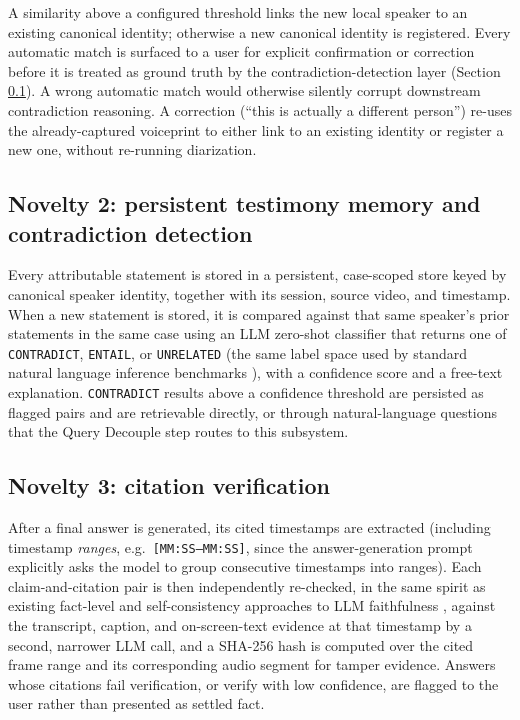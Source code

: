 \documentclass[3p,times,procedia]{elsarticle}
\begin{document}
A similarity above a configured threshold links the new local speaker to an existing
canonical identity; otherwise a new canonical identity is registered. Every
automatic match is surfaced to a user for explicit confirmation or correction before it
is treated as ground truth by the contradiction-detection layer (Section
\ref{sec:novelty2}). A wrong automatic match would otherwise silently corrupt
downstream contradiction reasoning. A correction (``this is actually a different
person'') re-uses the already-captured voiceprint to either link to an existing
identity or register a new one, without re-running diarization.

\subsection{Novelty 2: persistent testimony memory and contradiction detection}
\label{sec:novelty2}

Every attributable statement is stored in a persistent, case-scoped store keyed by
canonical speaker identity, together with its session, source video, and timestamp.
When a new statement is stored, it is compared against that same speaker's prior
statements in the same case using an LLM zero-shot classifier that returns one of
\texttt{CONTRADICT}, \texttt{ENTAIL}, or \texttt{UNRELATED} (the same label space used
by standard natural language inference benchmarks \cite{williams2018multinli,
nie2020anli}), with a confidence score and a free-text explanation. \texttt{CONTRADICT} results above a confidence threshold are
persisted as flagged pairs and are retrievable directly, or through natural-language
questions that the Query Decouple step routes to this subsystem.

\subsection{Novelty 3: citation verification}
\label{sec:novelty3}

After a final answer is generated, its cited timestamps are extracted (including
timestamp \emph{ranges}, e.g.\ \texttt{[MM:SS--MM:SS]}, since the answer-generation
prompt explicitly asks the model to group consecutive timestamps into ranges). Each
claim-and-citation pair is then independently re-checked, in the same spirit as
existing fact-level and self-consistency approaches to LLM faithfulness
\cite{min2023factscore, manakul2023selfcheckgpt, es2024ragas}, against the transcript,
caption, and on-screen-text evidence at that timestamp by a second, narrower LLM call,
and a SHA-256 hash is computed over the cited frame range and its corresponding audio
segment for tamper evidence. Answers whose citations fail verification, or verify with
low confidence, are flagged to the user rather than presented as settled fact.
\end{document}
